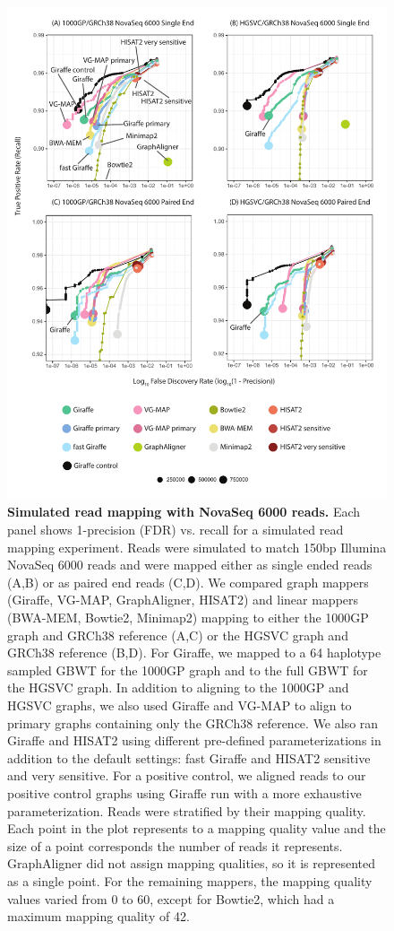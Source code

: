 \documentclass[11pt]{ucscthesis}
\begin{document}
\begin{figure}[H]
    \centering
    \includegraphics[width=.8\linewidth]{aim2_supplement_novaseq6000-all.pdf}
    \caption[Simulated read mapping with NovaSeq 6000 reads]{\textbf{Simulated read mapping with NovaSeq 6000 reads.} Each panel shows 1-precision (FDR) vs. recall for a simulated read mapping experiment. Reads were simulated to match 150bp Illumina NovaSeq 6000 reads and were mapped either as single ended reads (A,B) or as paired end reads (C,D). We compared graph mappers (Giraffe, VG-MAP, GraphAligner, HISAT2) and linear mappers (BWA-MEM, Bowtie2, Minimap2) mapping to either the 1000GP graph and GRCh38 reference (A,C) or the HGSVC graph and GRCh38 reference (B,D). For Giraffe, we mapped to a 64 haplotype sampled GBWT for the 1000GP graph and to the full GBWT for the HGSVC graph. In addition to aligning to the 1000GP and HGSVC graphs, we also used Giraffe and VG-MAP to align to primary graphs containing only the GRCh38 reference. We also ran Giraffe and HISAT2 using different pre-defined parameterizations in addition to the default settings: fast Giraffe and HISAT2 sensitive and very sensitive. For a positive control, we aligned reads to our positive control graphs using Giraffe run with a more exhaustive parameterization.
    Reads were stratified by their mapping quality. Each point in the plot represents to a mapping quality value and the size of a point corresponds the number of reads it represents. GraphAligner did not assign mapping qualities, so it is represented as a single point. For the remaining mappers, the mapping quality values varied from 0 to 60, except for Bowtie2, which had a maximum mapping quality of 42.}
    \label{fig:aim2_supplement_novaseq_rocs}
\end{figure}
\end{document}
